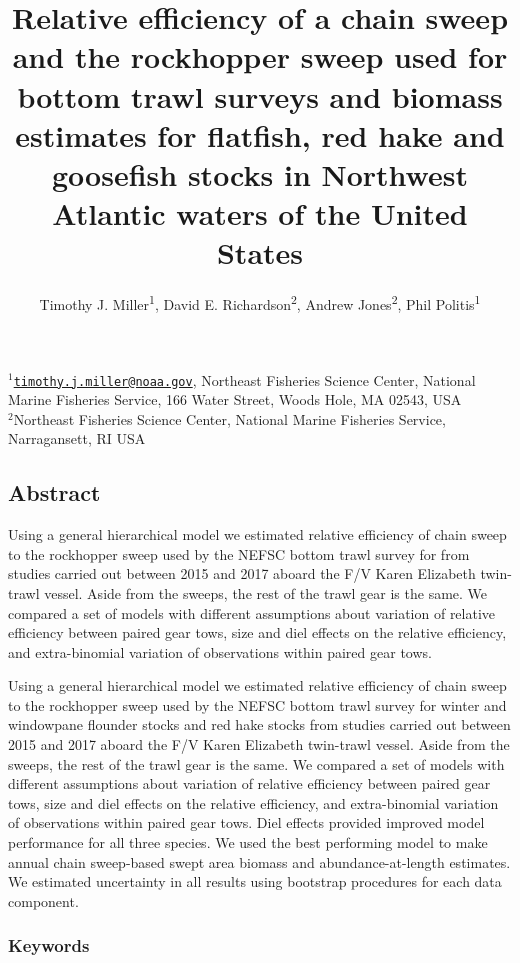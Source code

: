 \documentclass[]{article}
\title{Relative efficiency of a chain sweep and the rockhopper sweep used for
bottom trawl surveys and biomass estimates for flatfish, red hake and
goosefish stocks in Northwest Atlantic waters of the United States}
\author{Timothy J. Miller\textsuperscript{1}, David E.
Richardson\textsuperscript{2}, Andrew Jones\textsuperscript{2}, Phil
Politis\textsuperscript{1}}
\date{}
\begin{document}
\maketitle

\(^1\)\href{mailto:timothy.j.miller@noaa.gov}{\nolinkurl{timothy.j.miller@noaa.gov}},
Northeast Fisheries Science Center, National Marine Fisheries Service,
166 Water Street, Woods Hole, MA 02543, USA\\
\(^2\)Northeast Fisheries Science Center, National Marine Fisheries
Service, Narragansett, RI USA\\

\pagebreak

\hypertarget{abstract}{%
\subsection*{Abstract}\label{abstract}}

Using a general hierarchical model we estimated relative efficiency of
chain sweep to the rockhopper sweep used by the NEFSC bottom trawl
survey for from studies carried out between 2015 and 2017 aboard the F/V
Karen Elizabeth twin-trawl vessel. Aside from the sweeps, the rest of
the trawl gear is the same. We compared a set of models with different
assumptions about variation of relative efficiency between paired gear
tows, size and diel effects on the relative efficiency, and
extra-binomial variation of observations within paired gear tows.

Using a general hierarchical model we estimated relative efficiency of
chain sweep to the rockhopper sweep used by the NEFSC bottom trawl
survey for winter and windowpane flounder stocks and red hake stocks
from studies carried out between 2015 and 2017 aboard the F/V Karen
Elizabeth twin-trawl vessel. Aside from the sweeps, the rest of the
trawl gear is the same. We compared a set of models with different
assumptions about variation of relative efficiency between paired gear
tows, size and diel effects on the relative efficiency, and
extra-binomial variation of observations within paired gear tows. Diel
effects provided improved model performance for all three species. We
used the best performing model to make annual chain sweep-based swept
area biomass and abundance-at-length estimates. We estimated uncertainty
in all results using bootstrap procedures for each data component.

\hypertarget{keywords}{%
\subsubsection*{Keywords}\label{keywords}}
\end{document}
